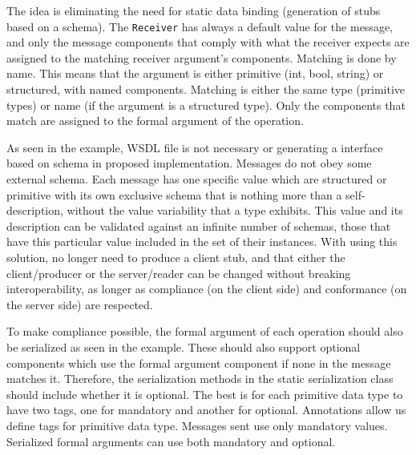 The  idea is eliminating the need for static data binding (generation of stubs based on a schema). The {\tt Receiver} has always a default value for the message, and only the message components that comply with what the receiver expects are assigned to the matching receiver argument's components. Matching is done by name. This means that the argument is either primitive (int, bool, string) or structured, with named components. Matching is either the same type (primitive types) or name (if the argument is a structured type). Only the components that match are assigned to the formal argument of the operation.

As seen in the example, WSDL file is not necessary or generating a interface based on schema in proposed implementation. Messages do not obey some external schema. Each message has one specific value which are structured or primitive with its own exclusive schema that is nothing more than a self-description, without the value variability that a type exhibits. This value and its description can be validated against an infinite number of schemas, those that have this particular value included in the set of their instances. With using this solution, no longer need to produce a client stub, and that either the client/producer or the server/reader can be changed without breaking interoperability, as longer as compliance (on the client side) and conformance (on the server side) are respected.

To make compliance possible, the formal argument of each operation should also be serialized as seen in the example. These should also support optional components which use the formal argument component if none in the message matches it. Therefore, the serialization methods in the static serialization class should include whether it is optional. The best is for each primitive data type to have two tags, one for mandatory and another for optional. Annotations allow us define tags for primitive data type.
Messages sent use only mandatory values. Serialized formal arguments can use both mandatory and optional.
